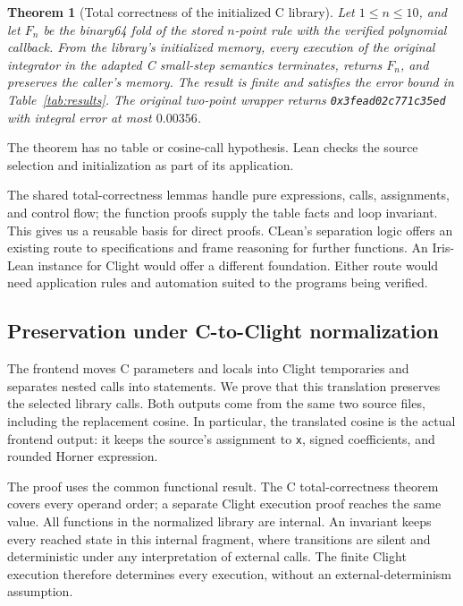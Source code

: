 \documentclass[11pt]{article}
\newtheorem{theorem}{Theorem}[section]
\newcommand{\code}[1]{%
  \ifmmode\text{\texttt{\detokenize{#1}}}\else\nolinkurl{#1}\fi}
\begin{document}
\begin{theorem}[Total correctness of the initialized C library]
\label{thm:c-total}
Let $1\le n\le10$, and let $F_n$ be the binary64 fold of the stored
$n$-point rule with the verified polynomial callback. From the library's
initialized memory, every execution of the original integrator in the
adapted C small-step semantics terminates, returns $F_n$, and preserves
the caller's memory. The result is finite and satisfies the error bound in
Table~\ref{tab:results}. The original two-point wrapper returns
\code{0x3fead02c771c35ed} with integral error at most $0.00356$.
\end{theorem}

The theorem has no table or cosine-call hypothesis. Lean checks the source
selection and initialization as part of its application.

The shared total-correctness lemmas handle pure expressions, calls,
assignments, and control flow; the function proofs supply the table facts
and loop invariant. This gives us a reusable basis for direct proofs.
CLean's separation logic offers an existing route to specifications and
frame reasoning for further functions. An Iris-Lean instance for Clight
would offer a different foundation. Either route would need application
rules and automation suited to the programs being verified.

\subsection{Preservation under C-to-Clight normalization}

The frontend moves C parameters and locals into Clight temporaries and
separates nested calls into statements. We prove that this translation
preserves the selected library calls. Both outputs come from the same two
source files, including the replacement cosine. In particular, the
translated cosine is the actual frontend output: it keeps the source's
assignment to \code{x}, signed coefficients, and rounded Horner expression.

The proof uses the common functional result. The C total-correctness theorem
covers every operand order; a separate Clight execution proof reaches the
same value. All functions in the normalized library are internal. An
invariant keeps every reached state in this internal fragment, where
transitions are silent and deterministic under any interpretation of external
calls. The finite Clight execution therefore determines every execution,
without an external-determinism assumption.
\end{document}
